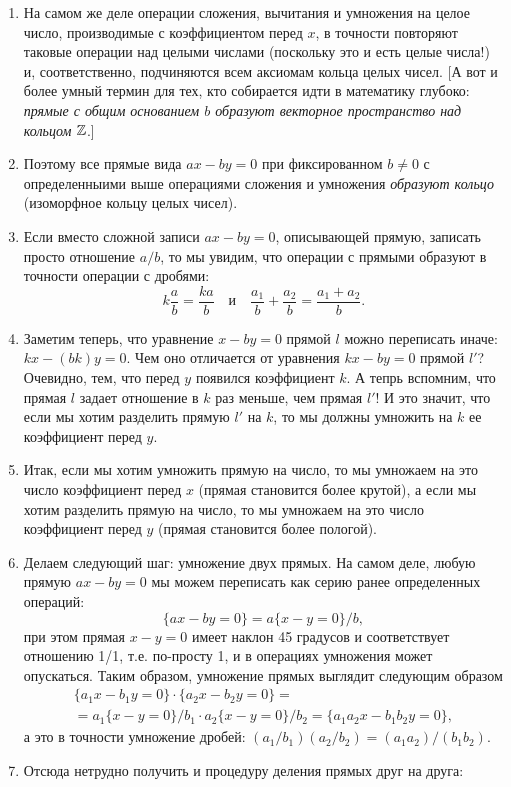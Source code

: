 \begin{enumerate}
\item На самом же деле операции сложения, вычитания и умножения на целое число, производимые с коэффициентом перед $x$, в точности повторяют таковые операции над целыми числами (поскольку это и есть целые числа!) и, соответственно, подчиняются всем аксиомам кольца целых чисел. [А вот и более умный термин для тех, кто собирается идти в математику глубоко: \textit{прямые с общим основанием $b$ образуют векторное пространство над кольцом} $\mathbb Z$.]
\item Поэтому все прямые вида $ax-by=0$ при фиксированном $b\ne 0$ с определенныими выше операциями сложения и умножения \textit{образуют кольцо} (изоморфное кольцу целых чисел). 
\item Если вместо сложной записи $ax-by=0$, описывающей прямую, записать просто отношение $a/b$, то мы увидим, что операции с прямыми образуют в точности операции с дробями:
$$
k\frac{a}{b}  = \frac{ka}{b}\quad\mbox{и}\quad\frac{a_1}{b}+\frac{a_2}{b} = \frac{a_1+a_2}{b}.
$$
\item Заметим теперь, что уравнение $x-by=0$ прямой $l$ можно переписать иначе: $kx-(bk)y=0$. Чем оно отличается от уравнения $kx-by=0$ прямой $l'$? Очевидно, тем, что перед $y$ появился коэффициент $k$. А тепрь вспомним, что прямая $l$ задает отношение в $k$ раз меньше, чем прямая $l'$! И это значит, что если мы хотим разделить прямую $l'$ на $k$, то мы должны умножить на $k$ ее коэффициент перед $y$.
\item Итак, если мы хотим умножить прямую на число, то мы умножаем на это число коэффициент перед $x$ (прямая становится более крутой), а если мы хотим разделить прямую на число, то мы умножаем на это число коэффициент перед $y$ (прямая становится более пологой).
\item Делаем следующий шаг: умножение двух прямых. На самом деле, любую прямую $ax-by=0$ мы можем переписать как серию ранее определенных операций:
$$
\{ax-by=0\} = a\{x-y=0\}/b,
$$
при этом прямая $x-y=0$ имеет наклон 45 градусов и соответствует отношению 1/1, т.е. по-просту 1, и в операциях умножения может опускаться. Таким образом, умножение прямых выглядит следующим образом
\begin{gather*}
\{a_1x-b_1y=0\}\cdot\{a_2x-b_2y=0\} = \\
= a_1\{x-y=0\}/b_1\cdot a_2\{x-y=0\}/b_2 = \{a_1a_2x-b_1b_2y=0\},
\end{gather*}
а это в точности умножение дробей: $(a_1/b_1)(a_2/b_2) = (a_1a_2)/(b_1b_2)$.
\item Отсюда нетрудно получить и процедуру деления прямых друг на друга:

\end{enumerate}
